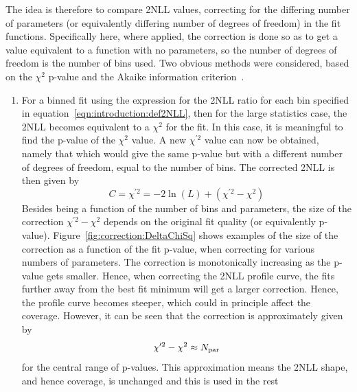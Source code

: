 The idea is therefore to compare 2NLL values,
correcting for the differing number of parameters 
(or equivalently differing number of degrees of freedom) in
the fit functions. Specifically here, where applied, the correction is
done so as to get a value equivalent to a function with no parameters, so
the number of degrees of freedom is the number of bins used.
Two obvious methods were considered, based on the 
$\chi^2$ p-value and the Akaike information 
criterion~\cite{ref:correction:akaike}.
\begin{enumerate}
\item %
For a binned fit using the expression for the 2NLL ratio
for each bin specified in equation~\ref{eqn:introduction:def2NLL}, then for
the large statistics case, the 2NLL becomes equivalent to a $\chi^2$ for the
fit. In this case, it is meaningful to find the p-value of the $\chi^2$ value.
A new $\chi^{\prime 2}$
value can now be obtained, namely that which would give the same p-value but
with a different number of degrees of freedom, equal to the number of bins.
The corrected 2NLL is then given by
\begin{displaymath}
C = \chi^{\prime 2} = - 2\ln(L) + (\chi^{\prime 2} - \chi^2)
\end{displaymath}
Besides being a function of the number of bins and parameters,
the size of the correction $\chi^{\prime 2} - \chi^2$
depends on the original fit quality
(or equivalently p-value). Figure~\ref{fig:correction:DeltaChiSq}
shows examples of the size of the correction as a function of the
fit p-value, when correcting for various numbers of parameters.
The correction is monotonically increasing as the p-value gets smaller.
Hence, when correcting the 2NLL profile curve, the fits further away from
the best fit minimum will get a larger correction. Hence, the profile curve
becomes steeper, which could in principle affect the coverage.
However, it can be seen that the correction is approximately given by
\begin{displaymath}
\chi^{\prime 2} - \chi^2 \approx N_{\rm par}
\end{displaymath}
for the central range of p-values. This approximation means the 
2NLL shape, and hence coverage, is unchanged and this is used in the rest

\end{enumerate}
